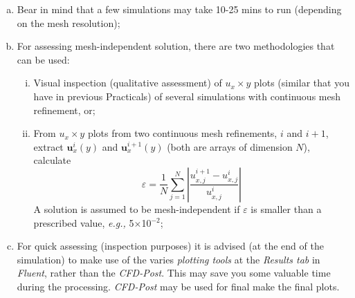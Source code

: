 \documentclass[12pts,a4paper,amsmath,amssymb,floatfix]{article}%
\newcommand{\eg}{{\it e.g., }}
\begin{document}
\begin{shaded}
\begin{enumerate}[a)]
             \item Bear in mind that a few simulations may take 10-25 mins to run (depending on the mesh resolution);
             \item For assessing mesh-independent solution, there are two methodologies that can be used:
                 \begin{enumerate}[i)]
                    \item Visual inspection (qualitative assessment) of $u_{x}\times y$ plots (similar that you have in previous Practicals) of several simulations with continuous mesh refinement, or;
                    \item From $u_{x}\times y$ plots from two continuous mesh refinements, $i$ and $i+1$, extract $\mathbf{u}_{x}^{i}(y)$ and $\mathbf{u}_{x}^{i+1}(y)$ (both are arrays of dimension $N$), calculate
                      \begin{displaymath}
                           \varepsilon = \frac{1}{N}\sum\limits_{j=1}^{N}\left|\frac{u_{x,j}^{i+1}-u_{x,j}^{i}}{u_{x,j}^{i}}\right|
                      \end{displaymath}
                      A solution is assumed to be mesh-independent if $\varepsilon$ is smaller than a prescribed value, \eg 5$\times$10$^{-2}$;
                 \end{enumerate}
             \item For quick assessing (inspection purposes) it is advised (at the end of the simulation) to make use of the varies {\it plotting tools} at the {\it Results tab} in {\it Fluent}, rather than the {\it CFD-Post}. This may save you some valuable time during the processing. {\it CFD-Post} may be used for final make the final plots.
        \end{enumerate}
     \end{shaded}
\end{document}
